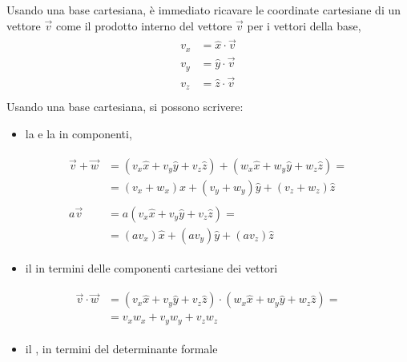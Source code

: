 \documentclass[letterpaper,10pt,italian]{jupyterBook}
\begin{document}
\sphinxAtStartPar
Usando una base cartesiana, è immediato ricavare le coordinate cartesiane di un vettore \(\vec{v}\) come il prodotto interno del vettore \(\vec{v}\) per i vettori della base,
\begin{equation*}
\begin{split}\begin{aligned}
  v_x & = \hat{x} \cdot \vec{v} \\
  v_y & = \hat{y} \cdot \vec{v} \\
  v_z & = \hat{z} \cdot \vec{v} \\
\end{aligned}\end{split}
\end{equation*}
\sphinxAtStartPar
Usando una base cartesiana, si possono scrivere:
\begin{itemize}
\item {} 
\sphinxAtStartPar
la  e la  in componenti,

\end{itemize}
\begin{equation*}
\begin{split}\begin{aligned}
     \vec{v} + \vec{w} & =   (v_x \hat{x} + v_y \hat{y} + v_z \hat{z}) + (w_x \hat{x} + w_y \hat{y} + w_z \hat{z}) = \\
                       & =   (v_x + w_x) \hat{x} + (v_y + w_y) \hat{y} + (v_z + w_z) \hat{z} \\ \\
   a \vec{v}           & = a (v_x \hat{x} + v_y \hat{y} + v_z \hat{z}) = \\
                       & =   ( a v_x ) \hat{x} + ( a v_y ) \hat{y} + ( a v_z ) \hat{z}
  \end{aligned}\end{split}
\end{equation*}\begin{itemize}
\item {} 
\sphinxAtStartPar
il  in termini delle componenti cartesiane dei vettori

\end{itemize}
\begin{equation*}
\begin{split}\begin{aligned}
    \vec{v} \cdot \vec{w}
    & = (v_x \hat{x} + v_y \hat{y} + v_z \hat{z}) \cdot (w_x \hat{x} + w_y \hat{y} + w_z \hat{z}) = \\
    & = v_x w_x + v_y w_y + v_z w_z
  \end{aligned}\end{split}
\end{equation*}\begin{itemize}
\item {} 
\sphinxAtStartPar
il , in termini del determinante formale

\end{itemize}
\end{document}
